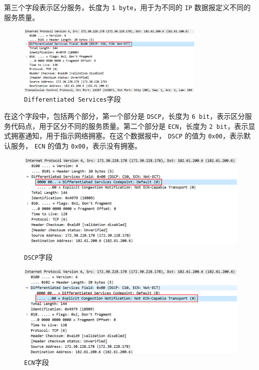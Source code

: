 \documentclass{article}
\begin{document}
第三个字段表示区分服务，长度为 \texttt{1 byte}，用于为不同的 \texttt{IP} 数据报定义不同的服务质量。

\begin{figure}[H]
  \centering
  \includegraphics[width=0.8\textwidth]{img/6.png}
  \caption{\texttt{Differentiated Services}字段}
  \label{fig:7}
\end{figure}

在这个字段中，包括两个部分，第一个部分是 \texttt{DSCP}，长度为 \texttt{6 bit}，表示区分服务代码点，用于区分不同的服务质量。第二个部分是 \texttt{ECN}，长度为 \texttt{2 bit}，表示显式拥塞通知，用于指示网络拥塞。在这个数据报中， \texttt{DSCP} 的值为 \texttt{0x00}，表示默认服务， \texttt{ECN} 的值为 \texttt{0x00}，表示没有拥塞。

\begin{figure}[H]
  \centering
  \begin{minipage}[t]{0.48\textwidth}
    \centering
    \includegraphics[width=\textwidth]{img/10.png}
    \caption{\texttt{DSCP}字段}
    \label{fig:8}
  \end{minipage}
  \begin{minipage}[t]{0.48\textwidth}
    \centering
    \includegraphics[width=\textwidth]{img/11.png}
    \caption{\texttt{ECN}字段}
    \label{fig:9}
  \end{minipage}
\end{figure}
\end{document}
